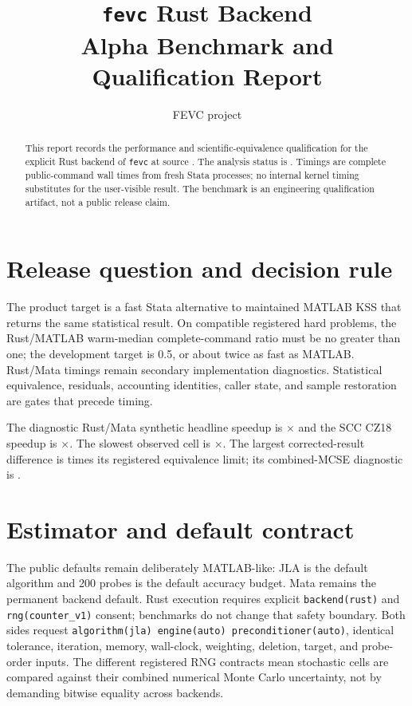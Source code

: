 \documentclass[11pt]{article}
\title{\texttt{fevc} Rust Backend\\Alpha Benchmark and Qualification Report}
\author{FEVC project}
\date{\AlphaGenerated}
\begin{document}
\maketitle

\begin{abstract}
This report records the performance and scientific-equivalence qualification
for the explicit Rust backend of \texttt{fevc} at source
\AlphaSourceShort.  The analysis status is \textbf{\AlphaStatus}.  Timings are
complete public-command wall times from fresh Stata processes; no internal
kernel timing substitutes for the user-visible result.  The benchmark is an
engineering qualification artifact, not a public release claim.
\end{abstract}

\section{Release question and decision rule}

The product target is a fast Stata alternative to maintained MATLAB KSS that
returns the same statistical result.  On compatible registered hard problems,
the Rust/MATLAB warm-median complete-command ratio must be no greater than one;
the development target is 0.5, or about twice as fast as MATLAB.  Rust/Mata
timings remain secondary implementation diagnostics.  Statistical
equivalence, residuals, accounting identities, caller state, and sample
restoration are gates that precede timing.

The diagnostic Rust/Mata synthetic headline speedup is
\textbf{\AlphaSyntheticSpeedup}$\times$ and the SCC CZ18 speedup is
\textbf{\AlphaCzSpeedup}$\times$.  The slowest observed cell is
\AlphaMinimumSpeedup$\times$.  The largest corrected-result difference is
\AlphaMaxEquivalenceRatio times its registered equivalence limit; its
combined-MCSE diagnostic is \AlphaMaxParityZ.

\section{Estimator and default contract}

The public defaults remain deliberately MATLAB-like: JLA is the default
algorithm and 200 probes is the default accuracy budget.  Mata remains the
permanent backend default.  Rust execution requires explicit
\texttt{backend(rust)} and \texttt{rng(counter\_v1)} consent; benchmarks do not
change that safety boundary.  Both sides request
\texttt{algorithm(jla) engine(auto) preconditioner(auto)}, identical
tolerance, iteration, memory, wall-clock, weighting, deletion, target, and
probe-order inputs.  The different registered RNG contracts mean stochastic
cells are compared against their combined numerical Monte Carlo uncertainty,
not by demanding bitwise equality across backends.
\end{document}
